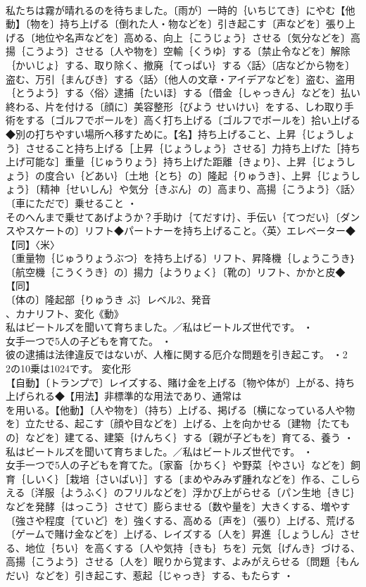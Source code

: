 \documentclass[8pt]{extreport}
\begin{document}
\begin{CJK}{UTF8}{min}
\\	私たちは霧が晴れるのを待ちました。〔雨が〕一時的｛いちじてき｝にやむ【他動】〔物を〕持ち上げる〔倒れた人・物などを〕引き起こす〔声などを〕張り上げる〔地位や名声などを〕高める、向上｛こうじょう｝させる〔気分などを〕高揚｛こうよう｝させる〔人や物を〕空輸｛くうゆ｝する〔禁止令などを〕解除｛かいじょ｝する、取り除く、撤廃｛てっぱい｝する〈話〉〔店などから物を〕盗む、万引｛まんびき｝する〈話〉〔他人の文章・アイデアなどを〕盗む、盗用｛とうよう｝する〈俗〉逮捕｛たいほ｝する〔借金｛しゃっきん｝などを〕払い終わる、片を付ける〔顔に〕美容整形｛びよう せいけい｝をする、しわ取り手術をする〔ゴルフでボールを〕高く打ち上げる〔ゴルフでボールを〕拾い上げる◆別の打ちやすい場所へ移すために。【名】持ち上げること、上昇｛じょうしょう｝させること持ち上げる［上昇｛じょうしょう｝させる］力持ち上げた［持ち上げ可能な］重量｛じゅうりょう｝持ち上げた距離｛きょり｝、上昇｛じょうしょう｝の度合い｛どあい｝〔土地｛とち｝の〕隆起｛りゅうき｝、上昇｛じょうしょう｝〔精神｛せいしん｝や気分｛きぶん｝の〕高まり、高揚｛こうよう｝〈話〉〔車にただで〕乗せること ・
\\	そのへんまで乗せてあげようか？手助け｛てだすけ｝、手伝い｛てつだい｝〔ダンスやスケートの〕リフト◆パートナーを持ち上げること。〈英〉エレベーター◆【同】〈米〉
\\	〔重量物｛じゅうりょうぶつ｝を持ち上げる〕リフト、昇降機｛しょうこうき｝〔航空機｛こうくうき｝の〕揚力｛ようりょく｝〔靴の〕リフト、かかと皮◆【同】
\\	〔体の〕隆起部｛りゅうき ぶ｝レベル2、発音
\\	、カナリフト、変化《動》
\\	私はビートルズを聞いて育ちました。／私はビートルズ世代です。 ・
\\	女手一つで5人の子どもを育てた。 ・
\\	彼の逮捕は法律違反ではないが、人権に関する厄介な問題を引き起こす。 ・2 
\\	2の10乗は1024です。	変化形 
\\	【自動】〔トランプで〕レイズする、賭け金を上げる〔物や体が〕上がる、持ち上げられる◆【用法】非標準的な用法であり、通常は
\\	を用いる。【他動】〔人や物を〕（持ち）上げる、掲げる〔横になっている人や物を〕立たせる、起こす〔顔や目などを〕上げる、上を向かせる〔建物｛たてもの｝などを〕建てる、建築｛けんちく｝する〔親が子どもを〕育てる、養う ・
\\	私はビートルズを聞いて育ちました。／私はビートルズ世代です。 ・
\\	女手一つで5人の子どもを育てた。〔家畜｛かちく｝や野菜｛やさい｝などを〕飼育｛しいく｝［栽培｛さいばい｝］する〔まめやみみず腫れなどを〕作る、こしらえる〔洋服｛ようふく｝のフリルなどを〕浮かび上がらせる〔パン生地｛きじ｝などを発酵｛はっこう｝させて〕膨らませる〔数や量を〕大きくする、増やす〔強さや程度｛ていど｝を〕強くする、高める〔声を〕（張り）上げる、荒げる〔ゲームで賭け金などを〕上げる、レイズする〔人を〕昇進｛しょうしん｝させる、地位｛ちい｝を高くする〔人や気持｛きも｝ちを〕元気｛げんき｝づける、高揚｛こうよう｝させる〔人を〕眠りから覚ます、よみがえらせる〔問題｛もんだい｝などを〕引き起こす、惹起｛じゃっき｝する、もたらす ・

\end{CJK}
\end{document}
